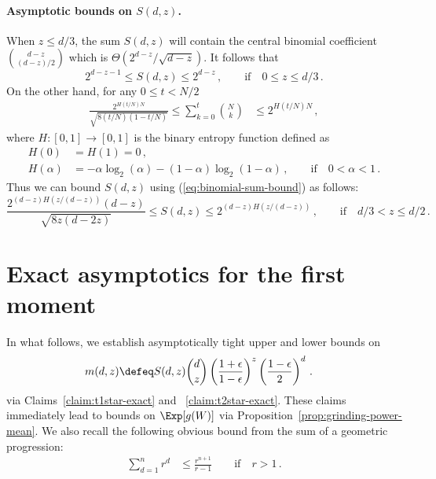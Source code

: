 \paragraph{Asymptotic bounds on $S(d,z)$.} 
When $z \leq d/3$, the sum $S(d,z)$ will contain the central binomial coefficient ${d-z \choose (d-z)/2}$ which is $\Theta(2^{d-z}/\sqrt{d-z})$. 
It follows that 
\begin{equation} \label{eq:S_d_z_small}
    2^{d-z-1} 
    \leq 
    S(d,z)
    \leq 2^{d-z}\,, 
    \qquad \text{if}\quad 0 \leq z \leq d/3 
    \,.
\end{equation}
On the other hand, for any $0 \leq t < N/2$
\begin{align}\label{eq:binomial-sum-bound}
\frac{2^{H(t/N)N} }{\sqrt{8 (t/N) (1-t/N)} }
\leq 
\sum_{k=0}^t{ {N \choose k} } 
&\leq 
2^{H(t/N)N} \, , 
\end{align}
where $H : [0, 1] \rightarrow [0, 1]$ is the binary entropy function defined as
\begin{align*}
    H(0) &= H(1) = 0\, , \\
    H(\alpha) &= -\alpha \log_2(\alpha) - (1-\alpha) \log_2(1-\alpha)\,, 
        \qquad \text{if}\quad 0 < \alpha < 1\, .
\end{align*}
Thus we can bound $S(d,z)$ using (\ref{eq:binomial-sum-bound}) as follows:
\begin{equation} \label{eq:S_d_z_large}
    \frac{2^{(d-z)H(z/(d-z))}(d-z)}{\sqrt{8 z(d-2z) }}
    \leq
    S(d, z) 
    \leq
    2^{(d-z)H(z/(d-z))}
    \,,\qquad \text{if} \quad d/3 < z \leq d/2 
    \,.
\end{equation}


\section{Exact asymptotics for the first moment}
\newcommand{\DoverTwo}{\lfloor d/2 \rfloor}
\newcommand{\DoverThree}{d/3}

In what follows, we establish asymptotically tight upper and lower bounds on 
\begin{align}\label{eq:m_z}
m(d,z) 
&\defeq S(d,z) {d \choose z} \left(\frac{1+\epsilon}{1-\epsilon}\right)^{z} \left(\frac{1-\epsilon}{2}\right)^{d} \, .
\end{align}
via Claims~\ref{claim:t1star-exact} and ~\ref{claim:t2star-exact}. These claims immediately lead to bounds on $\Exp[ g(W) ]$ via Proposition~\ref{prop:grinding-power-mean}.
We also recall the following obvious bound from the sum of a geometric progression:
\begin{align}\label{eq:geom-series-bound}
\sum_{d=1}^n{r^d} 
&\leq \frac{r^{n+1}}{r-1} \qquad \text{if}\quad r > 1\, .
\end{align}





